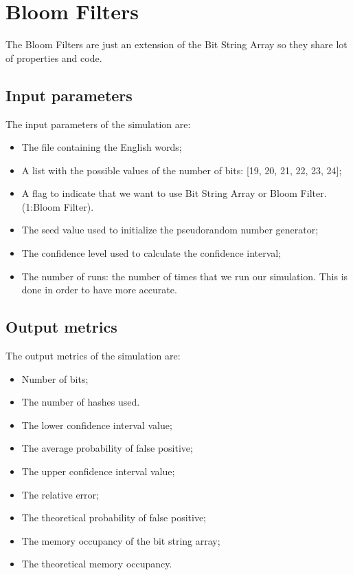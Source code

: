\documentclass[twocolumn,letterpaper]{report}
\begin{document}
{%
		
					\section{Bloom Filters}	 
	 				The Bloom Filters are just an extension of the Bit String Array so they share lot of properties and code. \
	 				
				\subsection{Input parameters}
					The input parameters of the simulation are:
					\begin{itemize}
						\item The file containing the English words;
						\item A list with the possible values of the number of bits: [19, 20, 21, 22, 23, 24];
						\item A flag to indicate that we want to use Bit String Array or Bloom Filter. (1:Bloom Filter).
						\item The seed value used to initialize the pseudorandom
number generator;
						\item The confidence level used to calculate the confidence interval;
						\item The number of runs: the number of times that we run our simulation. This is done in order to have more accurate.
					\end{itemize}
					 
			\subsection{Output metrics}
				The output metrics of the simulation are:
				\begin{itemize}
							\item Number of bits;
							\item The number of hashes used.
							\item The lower confidence interval value;
							\item The average probability of false positive;
							\item The upper confidence interval value;
							\item The relative error;
							\item The theoretical probability of false positive;
							\item The memory occupancy of the bit string array;
							\item The theoretical memory occupancy.
				\end{itemize}
				
}
\end{document}
